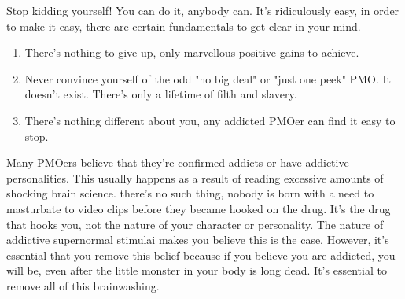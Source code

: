 \documentclass[easypeasy.tex]{subfiles}
\begin{document}
Stop kidding yourself! You can do it, anybody can. It's ridiculously easy, in order to make it easy, there are certain fundamentals to get clear in your mind.

\begin{enumerate}
  \item There's nothing to give up, only marvellous positive gains to achieve.
  \item Never convince yourself of the odd "no big deal" or "just one peek" PMO. It doesn't exist. There's only a lifetime of filth and slavery.
  \item There's nothing different about you, any addicted PMOer can find it easy to stop.
\end{enumerate}

Many PMOers believe that they're confirmed addicts or have addictive personalities. This usually happens as a result of reading excessive amounts of shocking brain science. there's no such thing, nobody is born with a need to masturbate to video clips before they became hooked on the drug. It's the drug that hooks you, not the nature of your character or personality. The nature of addictive supernormal stimulai makes you believe this is the case. However, it's essential that you remove this belief because if you believe you are addicted, you will be, even after the little monster in your body is long dead. It's essential to remove all of this brainwashing.
\end{document}
